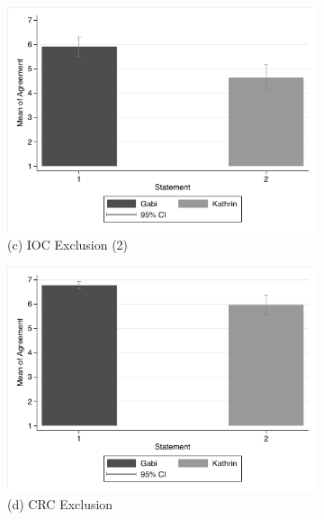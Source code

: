 \documentclass[egregdoesnotlikesansseriftitles,12pt]{scrartcl}
\begin{document}
\begin{landscape}
\begin{figure}[h!]
\begin{subfigure}[t]{0.28\textwidth}
      \includegraphics[scale=0.7]{figures/cup_ioc_2_bar.pdf}
      \caption{\textsf{\scriptsize(c) IOC Exclusion (2)}}
      \label{fig:cup_ioc_2_bar}
   \end{subfigure}
   \begin{subfigure}[t]{0.28\textwidth}
      \includegraphics[scale=0.7]{figures/cup_crc_bar.pdf}
      \caption{\textsf{\scriptsize(d) CRC Exclusion}}
      \label{fig:cup_crc_bar}
   \end{subfigure}
   \begin{subfigure}[t]{0.28\textwidth}

\end{subfigure}
\end{figure}
\end{landscape}
\end{document}
